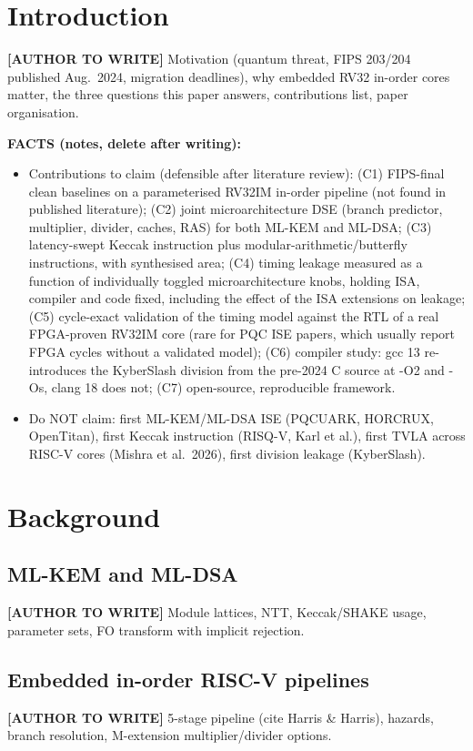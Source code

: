 \documentclass[preprint,12pt,authoryear]{elsarticle}
\newcommand{\AW}[1]{\par\noindent\colorbox{yellow!40}{\parbox{\linewidth}{\textbf{[AUTHOR TO WRITE]} #1}}\par}
\newenvironment{facts}{\par\small\noindent\textbf{FACTS (notes, delete after writing):}\begin{itemize}\setlength\itemsep{0pt}}{\end{itemize}\normalsize}
\begin{document}
\section{Introduction}\label{sec:intro}
\AW{Motivation (quantum threat, FIPS 203/204 published Aug.~2024, migration deadlines), why embedded RV32 in-order cores matter, the three questions this paper answers, contributions list, paper organisation.}
\begin{facts}
\item Contributions to claim (defensible after literature review):
  (C1) FIPS-final clean baselines on a parameterised RV32IM in-order pipeline (not found in published literature);
  (C2) joint microarchitecture DSE (branch predictor, multiplier, divider, caches, RAS) for both ML-KEM and ML-DSA;
  (C3) latency-swept Keccak instruction plus modular-arithmetic/butterfly instructions, with synthesised area;
  (C4) timing leakage measured as a function of individually toggled microarchitecture knobs, holding ISA, compiler and code fixed, including the effect of the ISA extensions on leakage;
  (C5) cycle-exact validation of the timing model against the RTL of a real FPGA-proven RV32IM core (rare for PQC ISE papers, which usually report FPGA cycles without a validated model);
  (C6) compiler study: gcc 13 re-introduces the KyberSlash division from the pre-2024 C source at -O2 and -Os, clang 18 does not;
  (C7) open-source, reproducible framework.
\item Do NOT claim: first ML-KEM/ML-DSA ISE (PQCUARK, HORCRUX, OpenTitan), first Keccak instruction (RISQ-V, Karl et al.), first TVLA across RISC-V cores (Mishra et al.~2026), first division leakage (KyberSlash).
\end{facts}

\section{Background}\label{sec:bg}
\subsection{ML-KEM and ML-DSA}
\AW{Module lattices, NTT, Keccak/SHAKE usage, parameter sets, FO transform with implicit rejection.}
\subsection{Embedded in-order RISC-V pipelines}
\AW{5-stage pipeline (cite Harris \& Harris), hazards, branch resolution, M-extension multiplier/divider options.}
\end{document}
